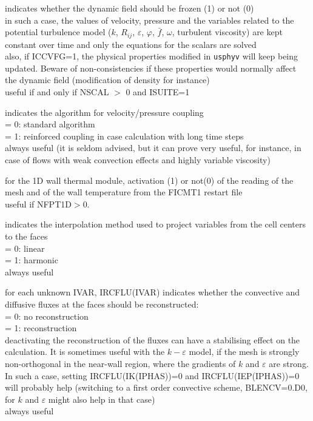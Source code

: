 {indicates whether the dynamic field should be frozen (1) or not (0)\\
in such a case, the values of velocity,
pressure and the variables related to the potential turbulence model
($k$, $R_{ij}$, $\varepsilon$, $\varphi$, $\bar{f}$, $\omega$, turbulent viscosity) are kept
constant over time and only the equations for the scalars are solved\\
also, if ICCVFG=1, the physical properties modified in \texttt{usphyv} will keep
being updated. Beware of non-consistencies if these properties would normally
affect the dynamic field (modification of density for instance)\\
useful if and only if NSCAL $>$ 0 and ISUITE=1}

{indicates the algorithm for velocity/pressure coupling\\
\hspace*{1.3cm}= 0: standard algorithm\\
\hspace*{1.3cm}= 1: reinforced coupling in case calculation with long
time steps\\ 
always useful (it is seldom advised, but it can prove very useful, for instance,
in case of flows with weak convection effects and highly variable viscosity)}

{for the  1D wall thermal module, activation (1) or not(0) of the reading  
of the mesh and of the wall temperature from the FICMT1 restart file\\
useful if NFPT1D$>$0.}

{indicates the interpolation method used to project variables from the cell
centers to the faces\\
\hspace*{1.3cm}= 0: linear\\
\hspace*{1.3cm}= 1: harmonic\\
always useful}

{for each unknown IVAR, IRCFLU(IVAR) indicates whether the convective
and diffusive fluxes at the faces should be reconstructed: \\
\hspace*{1.3cm}= 0: no reconstruction\\
\hspace*{1.3cm}= 1: reconstruction\\
deactivating the reconstruction of the fluxes can have a stabilising effect on
the calculation. It is sometimes useful with the $k-\varepsilon$ model, if the
mesh is strongly non-orthogonal in the near-wall region, where the gradients of
$k$ and $\varepsilon$ are strong. In such a case, setting IRCFLU(IK(IPHAS))=0
and IRCFLU(IEP(IPHAS))=0 will probably help (switching to a first order
convective scheme, BLENCV=0.D0, for $k$ and $\varepsilon$ might also help in
that case)\\
always useful}

